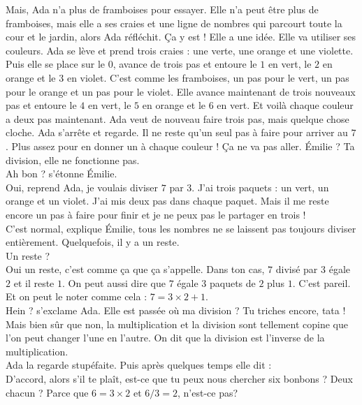 Mais, Ada n'a plus de framboises pour essayer. Elle n'a peut être plus de framboises, mais elle a ses craies et une ligne de nombres qui parcourt toute la cour et le jardin, alors Ada réfléchit. Ça y est ! Elle a une idée. Elle va utiliser ses couleurs.
Ada se lève et prend trois craies : une verte, une orange et une violette. Puis elle se place sur le $0$, avance de trois pas et entoure le $1$ en vert, le $2$ en orange et le $3$ en violet. C'est comme les framboises, un pas pour le vert, un pas pour le orange et un pas pour le violet.
Elle avance maintenant de trois nouveaux pas et entoure le $4$ en vert, le $5$ en orange et le $6$ en vert. Et voilà chaque couleur a deux pas maintenant.
Ada veut de nouveau faire trois pas, mais quelque chose cloche. Ada s'arrête et regarde. Il ne reste qu'un seul pas à faire pour arriver au $7$. Plus assez pour en donner un à chaque couleur ! Ça ne va pas aller.
\guillemotleft Émilie ? Ta division, elle ne fonctionne pas.\\
\mdash Ah bon ? s'étonne Émilie. \\
\mdash Oui, reprend Ada, je voulais diviser $7$ par $3$. J'ai trois paquets : un vert, un orange et un violet. J'ai mis deux pas dans chaque paquet. Mais il me reste encore un pas à faire pour finir et je ne peux pas le partager en trois !\\
\mdash C'est normal, explique Émilie, tous les nombres ne se laissent pas toujours diviser entièrement. Quelquefois, il y a un reste. \\
\mdash Un reste ? \\
\mdash Oui un reste, c'est comme ça que ça s'appelle. Dans ton cas, $7$ divisé par $3$ égale $2$ et il reste $1$. On peut aussi dire que $7$ égale $3$ paquets de $2$ plus $1$. C'est pareil. Et on peut le noter comme cela : $7=3\times2+1$. \\
\mdash Hein ? s'exclame Ada. Elle est passée où ma division ? Tu triches encore, tata ! \\
\mdash Mais bien sûr que non, la multiplication et la division sont tellement copine que l'on peut changer l'une en l'autre. On dit que la division est l'inverse de la multiplication. \guillemotright\\
Ada la regarde stupéfaite. Puis après quelques temps elle dit : \\
\guillemotleft D'accord, alors s'il te plaît, est-ce que tu peux nous chercher six bonbons ? Deux chacun ? Parce que $6 = 3 \times 2$ et $6 / 3 = 2$, n'est-ce pas? \guillemotright 

